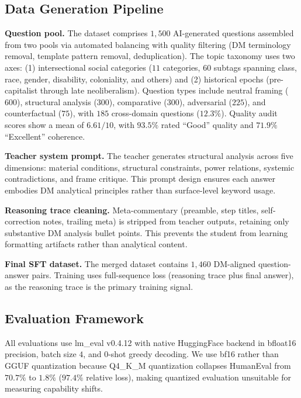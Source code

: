 \documentclass[sigconf]{acmart}
\begin{document}
\subsection{Data Generation Pipeline}

\textbf{Question pool.} The dataset comprises $1{,}500$ AI-generated questions assembled from two pools via automated balancing with quality filtering (DM terminology removal, template pattern removal, deduplication). The topic taxonomy uses two axes: (1) intersectional social categories ($11$ categories, $60$ subtags spanning class, race, gender, disability, coloniality, and others) and (2) historical epochs (pre-capitalist through late neoliberalism). Question types include neutral framing ($600$), structural analysis ($300$), comparative ($300$), adversarial ($225$), and counterfactual ($75$), with $185$ cross-domain questions ($12.3\%$). Quality audit scores show a mean of $6.61/10$, with $93.5\%$ rated ``Good'' quality and $71.9\%$ ``Excellent'' coherence.

\textbf{Teacher system prompt.} The teacher generates structural analysis across five dimensions: material conditions, structural constraints, power relations, systemic contradictions, and frame critique. This prompt design ensures each answer embodies DM analytical principles rather than surface-level keyword usage.

\textbf{Reasoning trace cleaning.} Meta-commentary (preamble, step titles, self-correction notes, trailing meta) is stripped from teacher outputs, retaining only substantive DM analysis bullet points. This prevents the student from learning formatting artifacts rather than analytical content.

\textbf{Final SFT dataset.} The merged dataset contains $1{,}460$ DM-aligned question-answer pairs. Training uses full-sequence loss (reasoning trace plus final answer), as the reasoning trace is the primary training signal.

\subsection{Evaluation Framework}

All evaluations use lm\_eval v0.4.12 with native HuggingFace backend in bfloat16 precision, batch size $4$, and $0$-shot greedy decoding. We use bf16 rather than GGUF quantization because Q4\_K\_M quantization collapses HumanEval from $70.7\%$ to $1.8\%$ ($97.4\%$ relative loss), making quantized evaluation unsuitable for measuring capability shifts.
\end{document}
